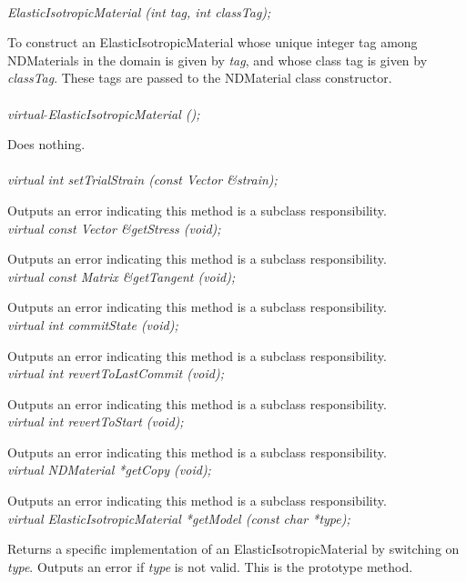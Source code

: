   \\
{\em ElasticIsotropicMaterial (int tag, int classTag);}  

To construct an ElasticIsotropicMaterial whose unique integer tag
among NDMaterials in the domain is given by {\em tag}, and whose class
tag is given by {\em classTag}.  These tags are passed to the
NDMaterial class constructor. \\

 \\
{\em virtual $\tilde{ }$ElasticIsotropicMaterial ();} 

Does nothing. \\ 

 \\
{\em virtual int setTrialStrain (const Vector \&strain); }  

Outputs an error indicating this method is a subclass responsibility. \\

{\em virtual const Vector \&getStress (void); } 

Outputs an error indicating this method is a subclass responsibility. \\

{\em virtual const Matrix \&getTangent (void); } 

Outputs an error indicating this method is a subclass responsibility. \\

{\em virtual int commitState (void); } 

Outputs an error indicating this method is a subclass responsibility. \\

{\em virtual int revertToLastCommit (void); } 

Outputs an error indicating this method is a subclass responsibility. \\

{\em virtual int revertToStart (void); } 

Outputs an error indicating this method is a subclass responsibility. \\

{\em virtual NDMaterial *getCopy (void); } 

Outputs an error indicating this method is a subclass responsibility. \\

{\em virtual ElasticIsotropicMaterial *getModel (const char *type); } 

Returns a specific implementation of an ElasticIsotropicMaterial by
switching on {\em type}.  Outputs an error if {\em type} is not valid.
This is the prototype method.